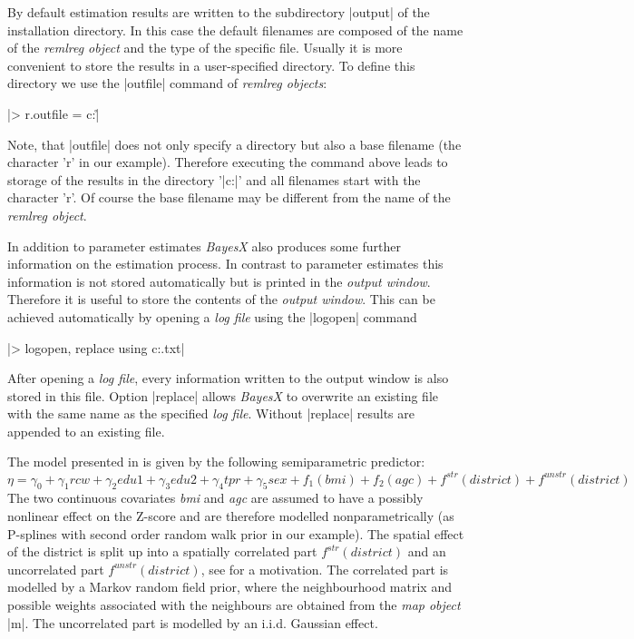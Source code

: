 \documentclass[a4paper]{article}
\begin{document}
By default estimation results are written to the subdirectory
|output| of the installation directory. In this case the default
filenames are composed of the name of the {\it remlreg object} and
the type of the specific file. Usually it is more convenient to
store the results in a user-specified directory. To define this
directory we use the |outfile| command of {\it remlreg objects}:

|> r.outfile = c:\data\r|

Note, that |outfile| does not only specify a directory but also a
base filename (the character 'r' in our example). Therefore
executing the command above leads to storage of the results in the
directory '|c:\data|' and all filenames start with the character
'r'. Of course the base filename may be different from the name of
the {\it remlreg object}.

In addition to parameter estimates {\it BayesX} also produces some
further information on the estimation process. In contrast to
parameter estimates this information is not stored automatically
but is printed in the {\it output window}. Therefore it is useful
to store the contents of the {\it output window}. This can be
achieved automatically by opening a {\it log file} using the
|logopen| command

|> logopen, replace using c:\data\logreml.txt|

After opening a {\it log file}, every information written to the
output window is also stored in this file. Option |replace| allows
{\it BayesX} to overwrite an existing file with the same name as the
specified {\it log file}. Without |replace| results are appended to
an existing file.

The model presented in  is given by the
following semiparametric predictor:
\[\eta=\gamma_0+\gamma_1rcw+\gamma_2edu1+\gamma_3edu2+\gamma_4tpr+\gamma_5sex+f_1(bmi)+f_2(agc)+f^{str}(district)+f^{unstr}(district)\]
The two continuous covariates {\em bmi} and {\em agc} are assumed to
have a possibly nonlinear effect on the Z-score and are therefore
modelled nonparametrically (as P-splines with second order random
walk prior in our example). The spatial effect of the district is
split up into a spatially correlated part $ f^{str}(district)$ and
an uncorrelated part $f^{unstr}(district)$, see  for a motivation. The correlated part is
modelled by a Markov random field prior, where the neighbourhood
matrix and possible weights associated with the neighbours are
obtained from the {\it map object} |m|. The uncorrelated part is
modelled by an  i.i.d. Gaussian effect.
\end{document}
